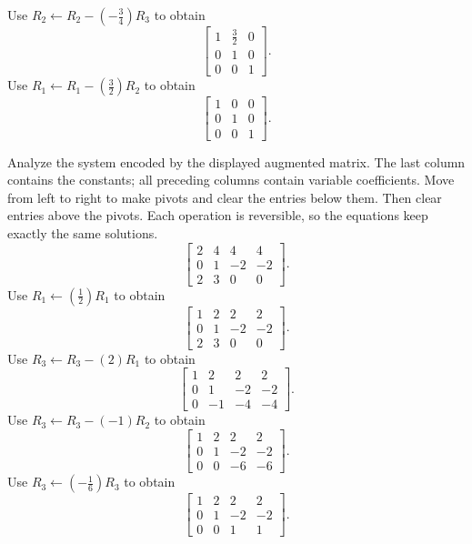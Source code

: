 Use $R_{2}\leftarrow R_{2}-(- \frac{3}{4})R_{3}$ to obtain
\[ \left[\begin{array}{rr|r}1&\frac{3}{2}&0\\0&1&0\\0&0&1\end{array}\right].\]
Use $R_{1}\leftarrow R_{1}-(\frac{3}{2})R_{2}$ to obtain
\[ \left[\begin{array}{rr|r}1&0&0\\0&1&0\\0&0&1\end{array}\right].\]

\goal Analyze the system encoded by the displayed augmented matrix. The last column contains the constants; all preceding columns contain variable coefficients.
\idea Move from left to right to make pivots and clear the entries below them. Then clear entries above the pivots. Each operation is reversible, so the equations keep exactly the same solutions.
\[ \left[\begin{array}{rrr|r}2&4&4&4\\0&1&-2&-2\\2&3&0&0\end{array}\right].\]
Use $R_{1}\leftarrow(\frac{1}{2})R_{1}$ to obtain
\[ \left[\begin{array}{rrr|r}1&2&2&2\\0&1&-2&-2\\2&3&0&0\end{array}\right].\]
Use $R_{3}\leftarrow R_{3}-(2)R_{1}$ to obtain
\[ \left[\begin{array}{rrr|r}1&2&2&2\\0&1&-2&-2\\0&-1&-4&-4\end{array}\right].\]
Use $R_{3}\leftarrow R_{3}-(-1)R_{2}$ to obtain
\[ \left[\begin{array}{rrr|r}1&2&2&2\\0&1&-2&-2\\0&0&-6&-6\end{array}\right].\]
Use $R_{3}\leftarrow(- \frac{1}{6})R_{3}$ to obtain
\[ \left[\begin{array}{rrr|r}1&2&2&2\\0&1&-2&-2\\0&0&1&1\end{array}\right].\]
